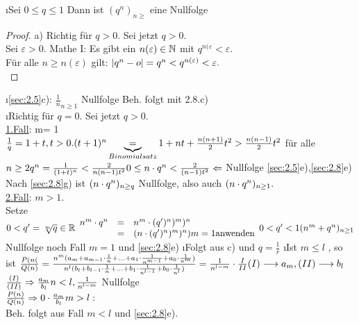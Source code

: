 \begin{enumerate}[a)]
\i Sei $0 \leq q \leq 1$ Dann ist $(q^n)_{n \geq}$ eine Nullfolge\\
\begin{proof}
a) Richtig für $q > 0$. Sei jetzt $q > 0$.\\
Sei $\varepsilon > 0$. Mathe I: Es gibt ein $n(\varepsilon) \in \mathbb{N}$ mit $q^{n(\varepsilon} < \varepsilon.$\\
Für alle $n \geq n(\varepsilon)$ gilt: $\lvert q^{n} -o \rvert = q^n < q^{n(\varepsilon)} < \varepsilon.$\\
\end{proof}
\i \ref{sec:2.5}c): $\frac{1}{n}_{n \geq 1}$ Nullfolge Beh. folgt mit 2.8.c)\\
\i Richtig für $q=0$. Sei jetzt $q > 0$.\\
\underline{1.Fall}: m= 1\\
$\frac{1}{q} = 1+t, t > 0.\\
(t+1)^n \underbrace{=}_{Binomialsatz} 1 + nt + \frac{n(n+1)}{2}t^2 > \frac{n(n-1)}{2}t^2$ für alle $n \geq 2\\
q^n = \frac{1}{(1+t)^n} < \frac{2}{n(n-1)t^2}\\
0 \leq n \cdot q^{n} < \frac{2}{(n-1)t^2} \Leftarrow$ Nullfolge \ref{sec:2.5}e),\ref{sec:2.8}e)\\
Nach \ref{sec:2.8}g) ist $(n \cdot q^n)_{n \geq q}$ Nullfolge, also auch $(n \cdot q^n)_{n \geq 1}.$\\
\underline{2.Fall}: $m > 1$.\\
Setze $0 < q' = \sqrt[m]{q} \in \mathbb{R}\\
\begin{array}{rcl}
n^m \cdot q^n &=& n^m \cdot (q')^n)^m)^n\\
&=& (n \cdot (q')^n)^m)^n) m = 1 \text{anwenden}
\end{array}\\
0 < q' < 1\\
(n^m + q^n)_{n \geq 1}$ Nullfolge noch Fall $m=1$ und \ref{sec:2.8}e)
\i Folgt aus c) und $q = \frac{1}{r}$
\i Ist $ m \leq l$ , so ist  $\frac{P(n(}{Q(n)} =\frac{n^m(a_m + a_{m-1}\cdot\frac{1}{n} + \ldots + a_1 \cdot \frac{1}{n^{m-1}} + a_0 \cdot \frac{1}{n^m})}{n^l(b_l + b_{l-1}\cdot\frac{1}{n} + \ldots + b_1 \cdot \frac{1}{n^{l-1}} + b_0 \cdot \frac{1}{n^l})}
= \frac{1}{n^{l-m}} \cdot \frac{I}{II}\\
(I) \longrightarrow a_m , (II) \longrightarrow b_l$
$\frac{(I)}{(II)} \Rightarrow \frac{a_m}{b_l}\\
n < l, \frac{1}{n^{l-m}}$ Nullfolge\\
$\frac{P(n)}{Q(n)} \Rightarrow 0 \cdot \frac{a_m}{b_l}\\
m > l:$\\
Beh. folgt aus Fall $m < l$ und \ref{sec:2.8}e).
\end{enumerate}
